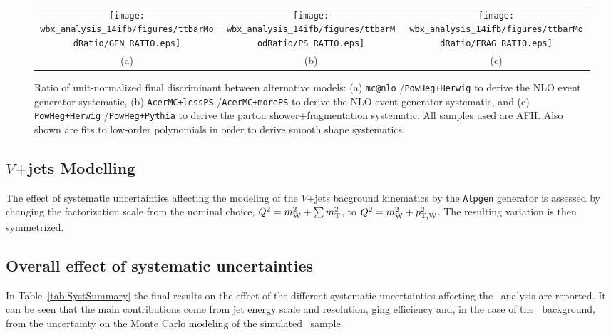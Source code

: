 \begin{figure}[htbp]
\begin{center}
\begin{tabular}{ccc}
\texttt{[image: wbx\_analysis\_14ifb/figures/ttbarModRatio/GEN\_RATIO.eps]} &
\texttt{[image: wbx\_analysis\_14ifb/figures/ttbarModRatio/PS\_RATIO.eps]} &
\texttt{[image: wbx\_analysis\_14ifb/figures/ttbarModRatio/FRAG\_RATIO.eps]} \\
(a) & (b) & (c) \\
\end{tabular}\caption{\small {Ratio of unit-normalized final discriminant between alternative models:
(a) \texttt{mc@nlo} /\texttt{PowHeg+Herwig}  to derive the NLO event generator systematic,
(b) \texttt{AcerMC+lessPS} /\texttt{AcerMC+morePS}  to derive the NLO event generator systematic, and
(c) \texttt{PowHeg+Herwig} /\texttt{PowHeg+Pythia}  to derive the parton shower+fragmentation systematic.
All samples used are AFII.
Also shown are fits to low-order polynomials in order to derive smooth shape systematics.}}
\label{fig:ttbarmodel_ratios}
\end{center}
\end{figure}
\fi

\subsection{$V$+jets Modelling}

The effect of systematic uncertainties affecting the 
modeling of the $V$+jets bacground kinematics by the \texttt{Alpgen}
generator is assessed by changing the factorization scale from the nominal
choice, $Q^2 =m_{\rm W}^2+\sum m_{\rm T}^2$, to $Q^2 =m_{\rm W}^2+p_{\rm T,W}^2$. 
The resulting variation is then symmetrized.



\subsection{Overall effect of systematic uncertainties}\label{sec:wbxALLSYS}

In Table~\ref{tab:SystSummary} the final results on
the effect of the different systematic uncertainties affecting
the \wbx\ analysis are reported. It can be seen that the main
contributions come from jet energy scale and resolution,
\btag ging efficiency and, in the case of the \ttbar\ 
background, from the uncertainty on the Monte Carlo modeling
of the simulated \ttbar\ sample.


